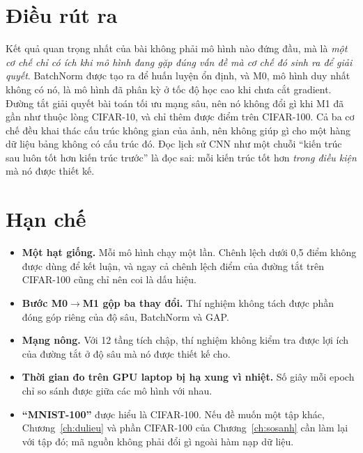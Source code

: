 \section{Điều rút ra}

Kết quả quan trọng nhất của bài không phải mô hình nào đứng đầu, mà là \emph{một cơ chế chỉ có ích khi mô hình đang gặp
đúng vấn đề mà cơ chế đó sinh ra để giải quyết}. BatchNorm được tạo ra để huấn luyện ổn định, và M0, mô hình duy nhất không có
nó, là mô hình đã phân kỳ ở tốc độ học cao khi chưa cắt gradient. Đường tắt giải quyết bài toán tối ưu mạng sâu, nên nó không đổi gì khi M1 đã gần như
thuộc lòng CIFAR-10, và chỉ thêm được  điểm trên CIFAR-100. Cả ba cơ chế đều khai thác cấu trúc không gian của ảnh,
nên không giúp gì cho một hàng dữ liệu bảng không có cấu trúc đó. Đọc lịch sử CNN như một chuỗi ``kiến trúc sau luôn tốt hơn
kiến trúc trước'' là đọc sai: mỗi kiến trúc tốt hơn \emph{trong điều kiện} mà nó được thiết kế.

\section{Hạn chế}

\begin{itemize}
  \item \textbf{Một hạt giống.} Mỗi mô hình chạy một lần. Chênh lệch dưới 0,5 điểm không được dùng để kết luận, và ngay cả
        chênh lệch  điểm của đường tắt trên CIFAR-100 cũng chỉ nên coi là dấu hiệu.
  \item \textbf{Bước M0$\to$M1 gộp ba thay đổi.} Thí nghiệm không tách được phần đóng góp riêng của độ sâu, BatchNorm và GAP.
  \item \textbf{Mạng nông.} Với 12 tầng tích chập, thí nghiệm không kiểm tra được lợi ích của đường tắt ở độ sâu mà nó được
        thiết kế cho.
  \item \textbf{Thời gian đo trên GPU laptop bị hạ xung vì nhiệt.} Số giây mỗi epoch chỉ so sánh được giữa các mô hình với nhau.
  \item \textbf{``MNIST-100''} được hiểu là CIFAR-100. Nếu đề muốn một tập khác, Chương~\ref{ch:dulieu} và phần CIFAR-100 của
        Chương~\ref{ch:sosanh} cần làm lại với tập đó; mã nguồn không phải đổi gì ngoài hàm nạp dữ liệu.
\end{itemize}

